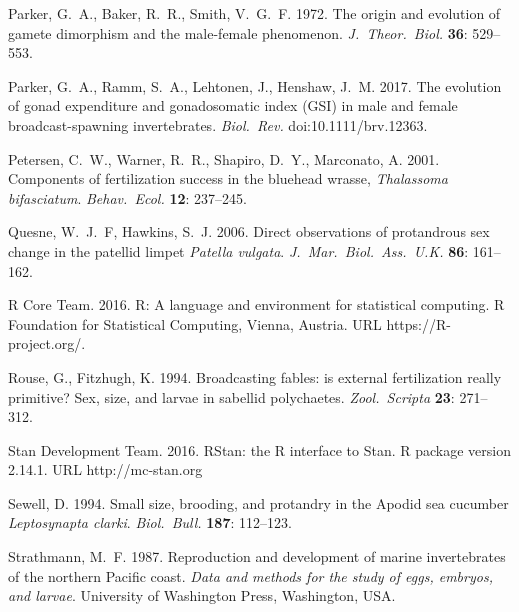 \documentclass{article}
\begin{document}
\begin{thebibliography}{}
Parker, G.~A., Baker, R.~R., Smith, V.~G.~F. 1972.
\newblock The origin and evolution of gamete dimorphism and the male-female phenomenon.
\newblock \textit{J.~Theor.~Biol.} \textbf{36}: 529--553.

Parker, G.~A., Ramm, S.~A., Lehtonen, J., Henshaw, J.~M. 2017.
\newblock The evolution of gonad expenditure and gonadosomatic index (GSI) in male and female broadcast-spawning invertebrates.
\newblock \textit{Biol.~Rev.} doi:10.1111/brv.12363.

Petersen, C.~W., Warner, R.~R., Shapiro, D.~Y., Marconato, A. 2001.
\newblock Components of fertilization success in the bluehead wrasse, \textit{Thalassoma bifasciatum}.
\newblock \textit{Behav.~Ecol.} \textbf{12}: 237--245.

Quesne, W.~J.~F, Hawkins, S.~J. 2006.
\newblock Direct observations of protandrous sex change in the patellid limpet \textit{Patella vulgata}.
\newblock \textit{J.~Mar.~Biol.~Ass.~U.K.} \textbf{86}: 161--162.

R Core Team. 2016.
\newblock R: A language and environment for statistical computing. 
\newblock R Foundation for Statistical Computing, Vienna, Austria. URL https://R-project.org/.

Rouse, G., Fitzhugh, K. 1994.
\newblock Broadcasting fables: is external fertilization really primitive? Sex, size, and larvae in sabellid polychaetes.
\newblock \textit{Zool.~Scripta} \textbf{23}: 271--312.

Stan Development Team. 2016.
\newblock RStan: the R interface to Stan.
\newblock R package version 2.14.1. URL http://mc-stan.org

Sewell, D. 1994.
\newblock Small size, brooding, and protandry in the Apodid sea cucumber \textit{Leptosynapta clarki}.
\newblock \textit{Biol.~Bull.} \textbf{187}: 112--123.

Strathmann, M.~F. 1987.
\newblock Reproduction and development of marine invertebrates of the northern Pacific coast. \textit{Data and methods for the study of eggs, embryos, and larvae}. University of Washington Press, Washington, USA.


\end{thebibliography}
\end{document}
